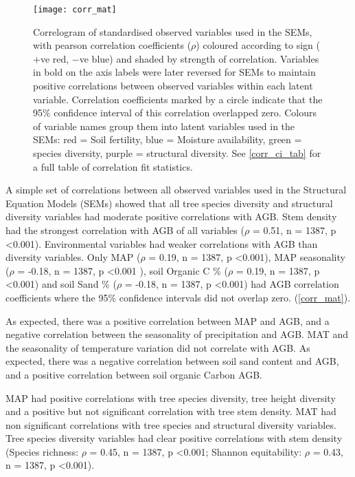 \documentclass[11pt,a4paper]{article}
\begin{document}
\begin{figure}[H]
\centering
	\texttt{[image: corr\_mat]}
	\caption{Correlogram of standardised observed variables used in the SEMs, with pearson correlation coefficients ($\rho$) coloured according to sign ($+$ve red, $-$ve blue) and shaded by strength of correlation. Variables in bold on the axis labels were later reversed for SEMs to maintain positive correlations between observed variables within each latent variable. Correlation coefficients marked by a circle indicate that the 95\% confidence interval of this correlation overlapped zero. Colours of variable names group them into latent variables used in the SEMs: red = Soil fertility, blue = Moisture availability, green = species diversity, purple = structural diversity. See \autoref{corr_ci_tab} for a full table of correlation fit statistics.}
	\label{corr_mat}
\end{figure}

A simple set of correlations between all observed variables used in the Structural Equation Models (SEMs) showed that all tree species diversity and structural diversity variables had moderate positive correlations with AGB. Stem density had the strongest correlation with AGB of all variables ($\rho$ = 0.51, n = 1387, p <0.001). Environmental variables had weaker correlations with AGB than diversity variables. Only MAP ($\rho$ = 0.19, n = 1387, p <0.001), MAP seasonality ($\rho$ = -0.18, n = 1387, p <0.001 ), soil Organic C \% ($\rho$ = 0.19, n = 1387, p <0.001) and soil Sand \% ($\rho$ = -0.18, n = 1387, p <0.001) had AGB correlation coefficients where the 95\% confidence intervals did not overlap zero. (\autoref{corr_mat}). 

As expected, there was a positive correlation between MAP and AGB, and a negative correlation between the seasonality of precipitation and AGB. MAT and the seasonality of temperature variation did not correlate with AGB. As expected, there was a negative correlation between soil sand content and AGB, and a positive correlation between soil organic Carbon AGB.

MAP had positive correlations with tree species diversity, tree height diversity and a positive but not significant correlation with tree stem density. MAT had non significant correlations with tree species and structural diversity variables. Tree species diversity variables had clear positive correlations with stem density (Species richness: $\rho$ = 0.45, n = 1387, p <0.001; Shannon equitability: $\rho$ = 0.43, n = 1387, p <0.001). 
\end{document}
